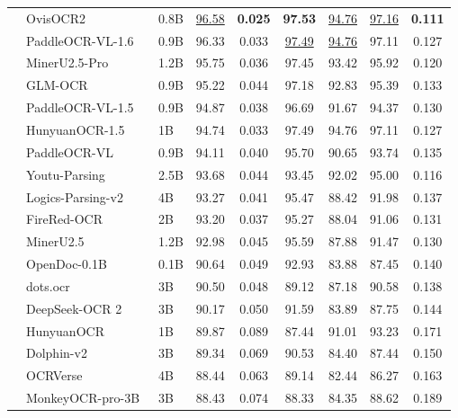 \documentclass{fairmeta}
\begin{document}
\begin{table}[t]
{\begin{tabular}{c|l l|c|c c c c c}
    & OvisOCR2~\cite{lu2026ovisocr2} & 0.8B & \underline{96.58} & \textbf{0.025} & \textbf{97.53} & \underline{94.76} & \underline{97.16} & \textbf{0.111} \\
    & PaddleOCR-VL-1.6~\cite{zhang2026paddleocr} & 0.9B & 96.33 & 0.033 & \underline{97.49} & \underline{94.76} & 97.11 & 0.127 \\
    & MinerU2.5-Pro~\cite{wang2026mineru2} & 1.2B & 95.75 & 0.036 & 97.45 & 93.42 & 95.92 & 0.120 \\
    & GLM-OCR~\cite{glm_ocr} & 0.9B & 95.22 & 0.044 & 97.18 & 92.83 & 95.39 & 0.133 \\
    & PaddleOCR-VL-1.5~\cite{paddleocr_vl15} & 0.9B & 94.87 & 0.038 & 96.69 & 91.67 & 94.37 & 0.130 \\
    & HunyuanOCR-1.5~\cite{li2026hunyuanocr} & 1B & 94.74 & 0.033 & 97.49 & 94.76 & 97.11 & 0.127 \\
    & PaddleOCR-VL~\cite{cui2025paddleocrvl} & 0.9B & 94.11 & 0.040 & 95.70 & 90.65 & 93.74 & 0.135 \\
    & Youtu-Parsing~\cite{YoutuParsing} & 2.5B & 93.68 & 0.044 & 93.45 & 92.02 & 95.00 & 0.116 \\
    & Logics-Parsing-v2~\cite{LogicsParsing} & 4B & 93.27 & 0.041 & 95.47 & 88.42 & 91.98 & 0.137 \\
    & FireRed-OCR~\cite{wu2026fireredocrtechnicalreport} & 2B & 93.20 & 0.037 & 95.27 & 88.04 & 91.06 & 0.131 \\
    & MinerU2.5 ~\cite{mineru25} & 1.2B & 92.98 & 0.045 & 95.59 & 87.88 & 91.47 & 0.130 \\
    & OpenDoc-0.1B~\cite{du2025unirec} & 0.1B & 90.64 & 0.049 & 92.93 & 83.88 & 87.45 & 0.140 \\
    & dots.ocr~\cite{dots_ocr} & 3B & 90.50 & 0.048 & 89.12 & 87.18 & 90.58 & 0.138 \\
    & DeepSeek-OCR 2~\cite{wei2025deepseek} & 3B & 90.17 & 0.050 & 91.59 & 83.89 & 87.75 & 0.144 \\
    & HunyuanOCR~\cite{hunyuanvisionteam2025hunyuanocrtechnicalreport} & 1B & 89.87 & 0.089 & 87.44 & 91.01 & 93.23 & 0.171 \\  
    & Dolphin-v2~\cite{feng2025dolphin} & 3B & 89.34 & 0.069 & 90.53 & 84.40 & 87.44 & 0.150 \\
    & OCRVerse~\cite{zhong2026ocrverseholisticocrendtoend} & 4B & 88.44 & 0.063 & 89.14 & 82.44 & 86.27 & 0.163 \\
    & MonkeyOCR-pro-3B~\cite{monkeyocr} & 3B & 88.43 & 0.074 & 88.33 & 84.35 & 88.62 & 0.189 \\

\end{tabular}}
\end{table}
\end{document}
